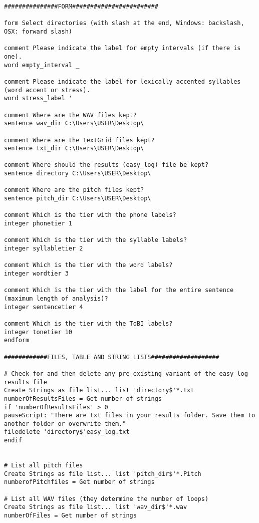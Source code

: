 \begin{Verbatim}[fontsize=\tiny]
###############FORM########################

form Select directories (with slash at the end, Windows: backslash, OSX: forward slash)

comment Please indicate the label for empty intervals (if there is one).
word empty_interval _

comment Please indicate the label for lexically accented syllables (word accent or stress).
word stress_label '

comment Where are the WAV files kept?
sentence wav_dir C:\Users\USER\Desktop\

comment Where are the TextGrid files kept?
sentence txt_dir C:\Users\USER\Desktop\

comment Where should the results (easy_log) file be kept?
sentence directory C:\Users\USER\Desktop\

comment Where are the pitch files kept? 
sentence pitch_dir C:\Users\USER\Desktop\

comment Which is the tier with the phone labels?
integer phonetier 1

comment Which is the tier with the syllable labels?
integer syllabletier 2

comment Which is the tier with the word labels?
integer wordtier 3

comment Which is the tier with the label for the entire sentence (maximum length of analysis)?
integer sentencetier 4

comment Which is the tier with the ToBI labels?
integer tonetier 10
endform

############FILES, TABLE AND STRING LISTS###################

# Check for and then delete any pre-existing variant of the easy_log results file
Create Strings as file list... list 'directory$'*.txt
numberOfResultsFiles = Get number of strings
if 'numberOfResultsFiles' > 0
pauseScript: "There are txt files in your results folder. Save them to another folder or overwrite them."
filedelete 'directory$'easy_log.txt
endif


# List all pitch files
Create Strings as file list... list 'pitch_dir$'*.Pitch
numberofPitchfiles = Get number of strings

# List all WAV files (they determine the number of loops)
Create Strings as file list... list 'wav_dir$'*.wav
numberOfFiles = Get number of strings


\end{Verbatim}
